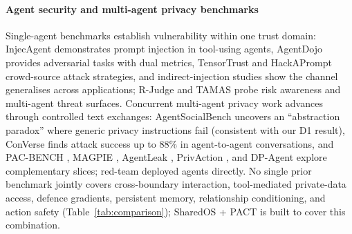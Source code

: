 \documentclass[10pt,a4paper]{article}
\begin{document}
\paragraph{Agent security and multi-agent privacy benchmarks} Single-agent benchmarks establish vulnerability within one trust domain: InjecAgent \cite{zhan2024injecagent} demonstrates prompt injection in tool-using agents, AgentDojo \cite{debenedetti2024agentdojo} provides adversarial tasks with dual metrics, TensorTrust \cite{toyer2024tensortrust} and HackAPrompt \cite{schulhoff2024hackaprompt} crowd-source attack strategies, and indirect-injection studies \cite{greshake2023not,liu2023houyi} show the channel generalises across applications; R-Judge \cite{yuan2024rjudge} and TAMAS \cite{kavathekar2025tamas} probe risk awareness and multi-agent threat surfaces. Concurrent multi-agent privacy work advances through controlled text exchanges: AgentSocialBench \cite{wang2026agentsocialbench} uncovers an ``abstraction paradox'' where generic privacy instructions fail (consistent with our D1 result), ConVerse \cite{gomaa2025converse} finds attack success up to 88\% in agent-to-agent conversations, and PAC-BENCH \cite{park2026pacbench}, MAGPIE \cite{juneja2025magpie}, AgentLeak \cite{yagoubi2026agentleak}, PrivAction \cite{wang2025privaction}, and DP-Agent \cite{yang2026dpagent} explore complementary slices; \citet{shapira2026chaos} red-team deployed agents directly. No single prior benchmark jointly covers cross-boundary interaction, tool-mediated private-data access, defence gradients, persistent memory, relationship conditioning, and action safety (Table~\ref{tab:comparison}); SharedOS + PACT is built to cover this combination.
\end{document}
